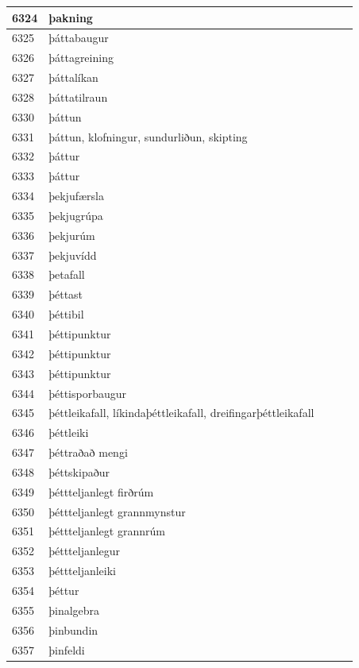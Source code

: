 \begin{longtable}{p{}|p{}|p{}|p{}|p{}}
\hline
6324 & þakning &  &  &  \\
\hline
6325 & þáttabaugur &  &  &  \\
\hline
6326 & þáttagreining &  &  &  \\
\hline
6327 & þáttalíkan &  &  &  \\
\hline
6328 & þáttatilraun &  &  &  \\
\hline
6330 & þáttun &  &  &  \\
\hline
6331 & þáttun, klofningur, sundurliðun, skipting &  &  &  \\
\hline
6332 & þáttur &  &  &  \\
\hline
6333 & þáttur &  &  &  \\
\hline
6334 & þekjufærsla &  &  &  \\
\hline
6335 & þekjugrúpa &  &  &  \\
\hline
6336 & þekjurúm &  &  &  \\
\hline
6337 & þekjuvídd &  &  &  \\
\hline
6338 & þetafall &  &  &  \\
\hline
6339 & þéttast &  &  &  \\
\hline
6340 & þéttibil &  &  &  \\
\hline
6341 & þéttipunktur &  &  &  \\
\hline
6342 & þéttipunktur &  &  &  \\
\hline
6343 & þéttipunktur &  &  &  \\
\hline
6344 & þéttisporbaugur &  &  &  \\
\hline
6345 & þéttleikafall, líkindaþéttleikafall, dreifingarþéttleikafall &  &  &  \\
\hline
6346 & þéttleiki &  &  &  \\
\hline
6347 & þéttraðað mengi &  &  &  \\
\hline
6348 & þéttskipaður &  &  &  \\
\hline
6349 & þéttteljanlegt firðrúm &  &  &  \\
\hline
6350 & þéttteljanlegt grannmynstur &  &  &  \\
\hline
6351 & þéttteljanlegt grannrúm &  &  &  \\
\hline
6352 & þéttteljanlegur &  &  &  \\
\hline
6353 & þéttteljanleiki &  &  &  \\
\hline
6354 & þéttur &  &  &  \\
\hline
6355 & þinalgebra &  &  &  \\
\hline
6356 & þinbundin &  &  &  \\
\hline
6357 & þinfeldi &  &  &  \\

\end{longtable}
